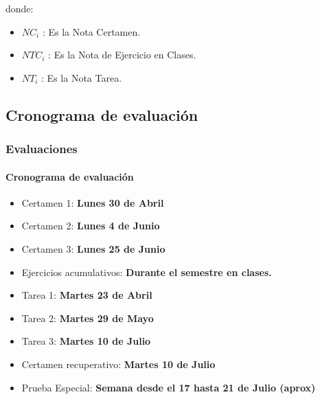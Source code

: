 \documentclass{beamer}
\begin{document}
			\begin{frame}
				\begin{center}

donde:
				\begin{itemize}

					\item[] $NC_{i}$ : Es la Nota Certamen.
					\item[] $NTC_{i}$ : Es la Nota de Ejercicio en Clases.
					\item[] $NT_{i}$ : Es la Nota Tarea.
				\end{itemize}
			\end{center}
		\end{frame}



		\subsection{Cronograma de evaluaci\'on}


		\begin{frame}
			\frametitle{Evaluaciones}
			\framesubtitle{Cronograma de evaluaci\'on}

			\begin{itemize}
				\item Certamen 1: \textbf{Lunes 30 de Abril}
				\item Certamen 2: \textbf{Lunes 4 de Junio}
				\item Certamen 3: \textbf{Lunes 25 de Junio}
				\item Ejercicios acumulativos: \textbf{Durante el semestre en clases.}
				\item Tarea 1: \textbf{Martes 23 de Abril}
				\item Tarea 2: \textbf{Martes 29 de Mayo}
				\item Tarea 3: \textbf{Martes 10 de Julio}
				\item Certamen recuperativo: \textbf{Martes 10 de Julio}
				\item Prueba Especial: \textbf{Semana desde el 17 hasta 21 de Julio (aprox)}
			\end{itemize}

		\end{frame}
\end{document}
